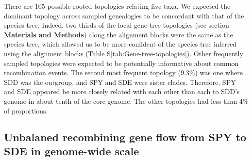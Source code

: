 \documentclass[english]{article}
\begin{document}
There are 105 possible rooted topologies relating five taxa.  We expected the
dominant topology across sampled genealogies to be concordant with that of the
species tree.  Indeed, two thirds of the local gene tree topologies (see section
\textbf{Materials and Methods}) along the alignment blocks were the same as the
species tree, which allowed us to be more confident of the species tree inferred
using the alignment blocks (Table S\ref{tab:Gene-tree-topologies}).  Other
frequently sampled topologies were expected to be potentially informative about
common recombination events.  The second most frequent topology (9.3\%) was one
where SDD was the outgroup, and SPY and SDE were sister clades. Therefore, SPY
and SDE appeared be more closely related with each other than each to SDD's
genome in about tenth of the core genome. The other topologies had less than 4\%
of proportions.  

\subsection{Unbalaned recombining gene flow from SPY to SDE in genome-wide scale}
\end{document}

